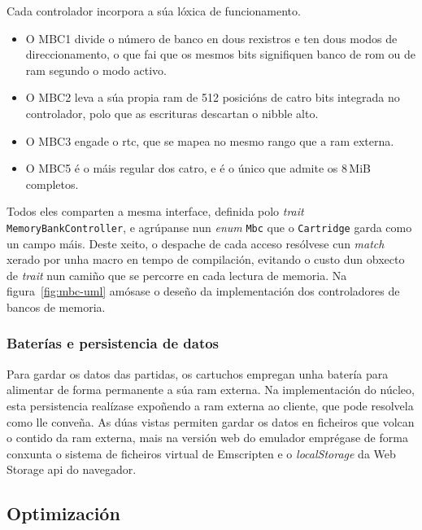 Cada controlador incorpora a súa lóxica de funcionamento.
\begin{itemize}
  \item O MBC1 divide o número de banco en dous rexistros e ten dous modos de direccionamento,
  o que fai que os mesmos bits signifiquen banco de \acrshort{rom} ou de \acrshort{ram} segundo o modo activo.
  \item O MBC2 leva a súa propia \acrshort{ram} de 512 posicións de catro bits integrada no controlador, polo que as escrituras descartan o \gls{nibble} alto.
  \item O MBC3 engade o \acrshort{rtc}, que se mapea no mesmo rango que a \acrshort{ram} externa.
  \item O MBC5 é o máis regular dos catro, e é o único que admite os 8\,MiB completos.
\end{itemize}

Todos eles comparten a mesma interface, definida polo \textit{trait} \texttt{MemoryBankController},
e agrúpanse nun \textit{enum} \texttt{Mbc} que o \texttt{Cartridge} garda como un campo máis.
Deste xeito, o despache de cada acceso resólvese cun \textit{match} xerado por unha macro en tempo de compilación,
evitando o custo dun obxecto de \textit{trait} nun camiño que se percorre en cada lectura de memoria.
Na figura~\ref{fig:mbc-uml} amósase o deseño da implementación dos controladores de bancos de memoria.




\subsubsection{Baterías e persistencia de datos}
Para gardar os datos das partidas, os cartuchos empregan unha batería para alimentar de forma permanente a súa \acrshort{ram} externa.
Na implementación do núcleo, esta persistencia realízase expoñendo a \acrshort{ram} externa ao cliente, que pode resolvela como lle conveña.
As dúas vistas permiten gardar os datos en ficheiros que volcan o contido da \acrshort{ram} externa, mais na versión web
do emulador emprégase de forma conxunta o sistema de ficheiros virtual de Emscripten e o \textit{localStorage} da Web Storage \acrshort{api} do navegador.



\subsection{Optimización}

